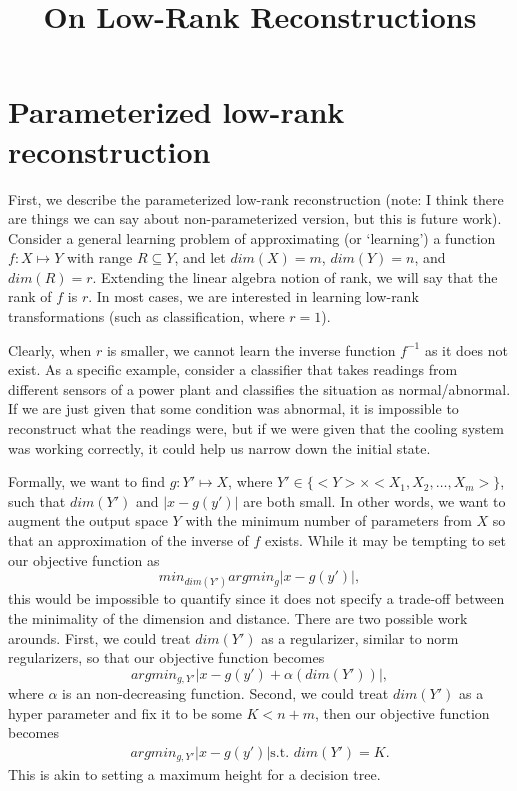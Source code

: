 \documentclass{article}
\title{On Low-Rank Reconstructions}
\date{}
\theoremstyle{definition}
\theoremstyle{remark}
\begin{document}
	\maketitle
	
	\section{Parameterized low-rank reconstruction}
	First, we describe the parameterized low-rank reconstruction (note: I think
	there are things we can say about non-parameterized version, but this
	is future work). Consider a general learning problem of approximating (or
	`learning') a function $f: X \mapsto Y$ with range $R \subseteq Y$, and
	let $dim(X) = m$, $dim(Y) = n$, and $dim(R) = r$. Extending the linear
	algebra notion of rank, we will say that the rank of $f$ is $r$. In most cases,
	we are interested in learning low-rank transformations (such as classification,
	where $r = 1$).
	
	Clearly, when $r$ is smaller, we cannot learn the inverse function $f^{-1}$
	as it does not exist. As a specific example, consider a classifier that takes 
	readings from different sensors of a power plant and classifies the situation
	as normal/abnormal. If we are just given that some condition was
	abnormal, it is impossible to reconstruct what the readings were, 
	but if we were given that the cooling system was working correctly, it could
	help us narrow down the initial state. 
	
	Formally, we want to find $g: Y' \mapsto X$, where $Y' \in 
	\{ <Y> \times <X_1,X_2,\dots,X_m>\}$, such that $dim(Y')$ and
	$\left| x - g(y') \right|$ are both small. In other words, we want to augment
	the output space $Y$ with the minimum number of parameters from $X$ so
	that an approximation of the inverse of $f$ exists. While it may be tempting
	to set our objective function as 
	$$ min_{dim(Y')} argmin_{g} \left| x-g(y') \right|,$$
	this would be impossible to quantify since it does not specify a trade-off
	between the minimality of the dimension and distance. There are two possible
	work arounds. First, we could treat $dim(Y')$ as a regularizer, similar to 
	norm regularizers, so that our objective function becomes
	$$ argmin_{g,Y'} \left| x-g(y') + \alpha(dim(Y')) \right|,$$
	where $\alpha$ is an non-decreasing function. Second, we could treat 
	$dim(Y')$ as a hyper parameter and fix it to be some $K < n+m$, then our
	objective function becomes
	\begin{align*}
	argmin_{g,Y'} \left| x-g(y') \right| \text{s.t. $dim(Y') = K$}.
	\end{align*}
	This is akin to setting a maximum height for a decision tree.
\end{document}
